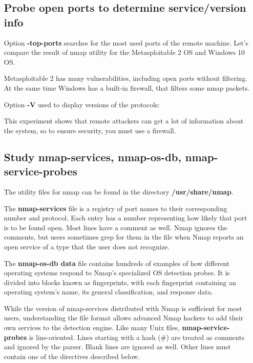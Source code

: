 \documentclass[14pt,a4paper,report]{report}
\begin{document}


\subsection{Probe open ports to determine service/version info}

Option \textbf{-top-ports} searches for the most used ports of the remote machine. Let's compare the result of nmap utility for the Metasploitable 2 OS and Windows 10 OS.



Metasploitable 2 has many vulnerabilities, including open ports without filtering. At the same time Windows has a built-in firewall, that filters some nmap packets.

Option \textbf{-V} used to display versions of the protocols:



This experiment shows that remote attackers can get a lot of information about the system, so to ensure security, you must use a firewall.

\subsection{Study nmap-services, nmap-os-db, nmap-service-probes}

The utility files for nmap can be found in the directory \textbf{/usr/share/nmap}.

The \textbf{nmap-services} file is a registry of port names to their corresponding number and protocol. Each entry has a number representing how likely that port is to be found open. Most lines have a comment as well. Nmap ignores the comments, but users sometimes grep for them in the file when Nmap reports an open service of a type that the user does not recognize.



The \textbf{nmap-os-db data} file contains hundreds of examples of how different operating systems respond to Nmap's specialized OS detection probes. It is divided into blocks known as fingerprints, with each fingerprint containing an operating system's name, its general classification, and response data.



While the version of nmap-services distributed with Nmap is sufficient for most users, understanding the file format allows advanced Nmap hackers to add their own services to the detection engine. Like many Unix files, \textbf{nmap-service-probes} is line-oriented. Lines starting with a hash (\#) are treated as comments and ignored by the parser. Blank lines are ignored as well. Other lines must contain one of the directives described below.
\end{document}

